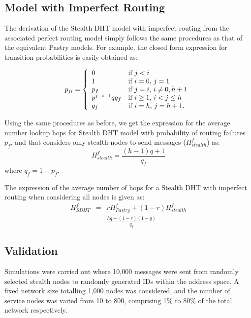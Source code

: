 \documentclass[10pt,twocolumn]{article}
\begin{document}
\subsection{Model with Imperfect Routing}

The derivation of the Stealth DHT model with imperfect routing from the
associated perfect routing model simply follows the same procedures as that of
the equivalent Pastry models. For example, the closed form expression for
transition probabilities is easily obtained as:

\[ p_{ji} = \left\{ \begin{array}{ll}
         0 & \mbox{if $j < i$}\\
         1 & \mbox{if $i = 0$,  $j = 1$}\\
         p_f & \mbox{if $j = i$,  $i \neq 0, h+1 $}\\
         p^{j-i-1}qq_f & \mbox{if $ i \ge 1$, $ i < j \le h$} \\
         q_f & \mbox{if $i = h$, $j = h+1$}
         .\end{array} \right. \]

Using the same procedures as before, we get the expression for the
average number lookup hops for Stealth DHT model with probability of
routing failures $p_f$, and that considers only stealth nodes to
send messages ($H_{stealth}^f$) as:
\begin{equation}
\label{Hsf} H^f_{stealth} = \frac{(h-1)q + 1}{q_f}
\end{equation}
where $q_f = 1-p_f$.

The expression of the average number of hops for a Stealth DHT with imperfect
routing when considering all nodes is given as:
\begin{eqnarray}
\nonumber
 H_{SDHT}^f &=& rH_{Pastry}^f  +  (1-r)H_{stealth}^f \\
\label{complete_sdht_f}
 &=& \frac{hq  + (1-r)(1-q)}{q_f}
\end{eqnarray}

\subsection{Validation}
Simulations were carried out where 10,000 messages were sent from randomly
selected stealth nodes to randomly generated IDs within the address space. A
fixed network size totalling 1,000 nodes was considered, and the number of
service nodes was varied from 10 to 800, comprising 1\% to 80\% of the total
network respectively.
\end{document}
